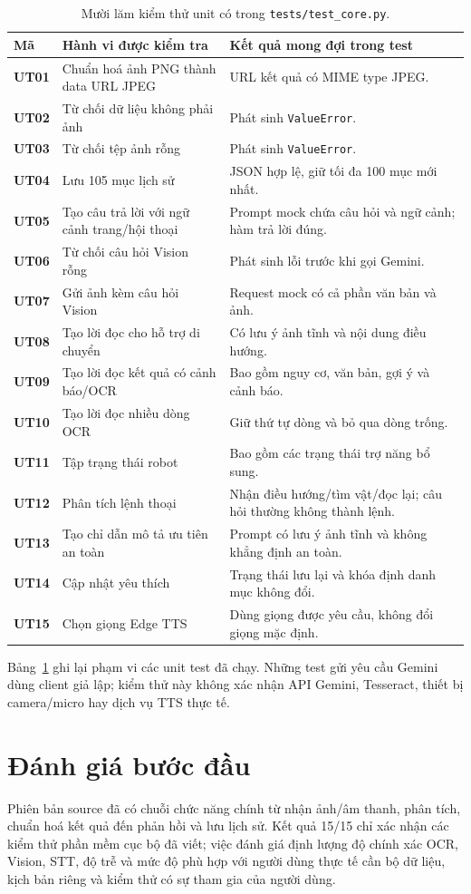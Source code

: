 \begin{table}[H]
\centering
\small
\caption{Mười lăm kiểm thử unit có trong \texttt{tests/test\_core.py}.}
\label{tab:kiemthu}
\begin{tabular*}{\textwidth}{@{\extracolsep{\fill}}>{\bfseries\color{daunavy}}p{0.8cm} p{7.0cm} p{6.0cm}}
\toprule
\rowcolor{gray100}
Mã & Hành vi được kiểm tra & Kết quả mong đợi trong test \\
\midrule
UT01 & Chuẩn hoá ảnh PNG thành data URL JPEG & URL kết quả có MIME type JPEG. \\
UT02 & Từ chối dữ liệu không phải ảnh & Phát sinh \texttt{ValueError}. \\
UT03 & Từ chối tệp ảnh rỗng & Phát sinh \texttt{ValueError}. \\
UT04 & Lưu 105 mục lịch sử & JSON hợp lệ, giữ tối đa 100 mục mới nhất. \\
UT05 & Tạo câu trả lời với ngữ cảnh trang/hội thoại & Prompt mock chứa câu hỏi và ngữ cảnh; hàm trả lời đúng. \\
UT06 & Từ chối câu hỏi Vision rỗng & Phát sinh lỗi trước khi gọi Gemini. \\
UT07 & Gửi ảnh kèm câu hỏi Vision & Request mock có cả phần văn bản và ảnh. \\
UT08 & Tạo lời đọc cho hỗ trợ di chuyển & Có lưu ý ảnh tĩnh và nội dung điều hướng. \\
UT09 & Tạo lời đọc kết quả có cảnh báo/OCR & Bao gồm nguy cơ, văn bản, gợi ý và cảnh báo. \\
UT10 & Tạo lời đọc nhiều dòng OCR & Giữ thứ tự dòng và bỏ qua dòng trống. \\
UT11 & Tập trạng thái robot & Bao gồm các trạng thái trợ năng bổ sung. \\
UT12 & Phân tích lệnh thoại & Nhận điều hướng/tìm vật/đọc lại; câu hỏi thường không thành lệnh. \\
UT13 & Tạo chỉ dẫn mô tả ưu tiên an toàn & Prompt có lưu ý ảnh tĩnh và không khẳng định an toàn. \\
UT14 & Cập nhật yêu thích & Trạng thái lưu lại và khóa định danh mục không đổi. \\
UT15 & Chọn giọng Edge TTS & Dùng giọng được yêu cầu, không đổi giọng mặc định. \\
\bottomrule
\end{tabular*}
\end{table}

Bảng~\ref{tab:kiemthu} ghi lại phạm vi các unit test đã chạy. Những test gửi
yêu cầu Gemini dùng client giả lập; kiểm thử này không xác nhận API Gemini,
Tesseract, thiết bị camera/micro hay dịch vụ TTS thực tế.

\section{Đánh giá bước đầu}

Phiên bản source đã có chuỗi chức năng chính từ nhận ảnh/âm thanh, phân tích,
chuẩn hoá kết quả đến phản hồi và lưu lịch sử. Kết quả 15/15 chỉ xác nhận các
kiểm thử phần mềm cục bộ đã viết; việc đánh giá định lượng độ chính xác OCR,
Vision, STT, độ trễ và mức độ phù hợp với người dùng thực tế cần bộ dữ liệu,
kịch bản riêng và kiểm thử có sự tham gia của người dùng.
